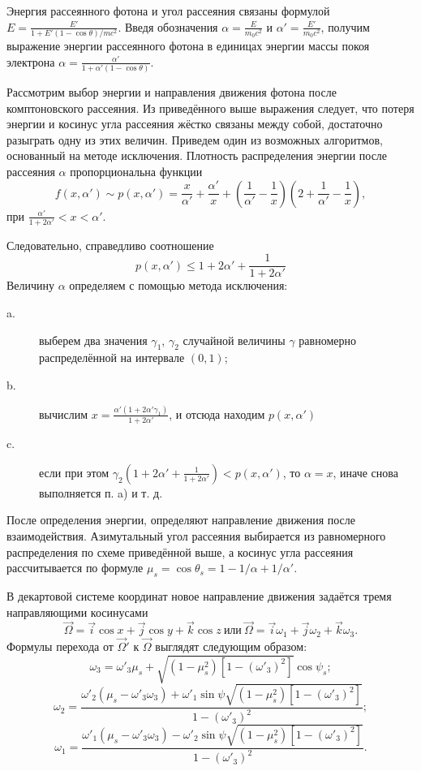 \documentclass[
11pt,
master, %
subf, %
href, %
colorlinks=true, %
]{disser}
\begin{document}
Энергия рассеянного фотона и угол рассеяния связаны формулой $E= \frac{E'}{1+E'(1-\cos \theta )/mc^{2}}$. Введя обозначения $\alpha =\frac{E}{m_{0} c^{2}} $ и $\alpha '=\frac{E'}{m_{0} c^{2} } $, получим выражение энергии рассеянного фотона в единицах энергии массы покоя электрона
$\alpha =\frac{\alpha '}{1+\alpha '(1-\cos \theta )}.$

Рассмотрим выбор энергии и направления движения фотона после комптоновского рассеяния. Из приведённого выше выражения следует, что потеря энергии и косинус угла рассеяния жёстко связаны между собой, достаточно разыграть одну из этих величин. Приведем один из возможных алгоритмов, основанный на методе исключения. Плотность распределения энергии после рассеяния $\alpha $ пропорциональна функции
\[
f(x,\alpha ')\sim p(x,\alpha ')=\frac{x}{\alpha '} +\frac{\alpha '}{x} + \left(\frac{1}{\alpha '} -\frac{1}{x} \right) \left(2+\frac{1}{\alpha '} -\frac{1}{x} \right),
\]
при $\frac{\alpha '}{1+2\alpha '} <x<\alpha '$.

Следовательно, справедливо соотношение
\[p(x,\alpha ')\le 1+2\alpha '+\frac{1}{1+2\alpha '} \]
Величину $\alpha $ определяем с помощью метода исключения:
\begin{description}
  \item[a.] выберем два значения $\gamma _{1} $, $\gamma _{2} $ случайной величины  $\gamma $ равномерно распределённой на интервале $(0,1)$;
  \item[b.] вычислим $x=\frac{\alpha ' \left(1+2\alpha '\gamma _{1} \right)}{1+2\alpha '} $, и отсюда находим $p \left(x,\alpha ' \right)$
  \item[c.] если при этом $\gamma _{2} \left(1+2\alpha '+\frac{1}{1+2\alpha '} \right)<p(x,\alpha ')$, то $\alpha =x$, иначе снова выполняется п. a) и т. д.
\end{description}

После определения энергии, определяют направление движения после взаимодействия. Азимутальный угол рассеяния выбирается из равномерного распределения по схеме приведённой выше, а косинус угла рассеяния рассчитывается по формуле  $\mu _{s} =\cos \theta _{s} =1-1/\alpha +1/\alpha '$.

В декартовой системе координат новое направление движения задаётся тремя направляющими косинусами
$$\vec{\Omega }=\vec{i}\cos x+\vec{j}\cos y+\vec{k}\cos z~\text{или}~\vec{\Omega }=\vec{i}\omega _{1} +\vec{j}\omega _{2} +\vec{k}\omega _{3}.$$
Формулы перехода от $\vec{\Omega }'$ к $\vec{\Omega }$ выглядят следующим образом:
$$
\omega _{3} =\omega '_{3} \mu _{s} +\sqrt{ \left(1-\mu _{s}^{2} \right) \left[1- \left(\omega '_{3} \right)^{2} \right]} \cos \psi _{s};
$$
$$
\omega _{2} =\frac{\omega '_{2} \left(\mu _{s} -\omega '_{3} \omega _{3} \right)+\omega '_{1} \sin \psi \sqrt{\left(1-\mu _{s}^{2} \right) \left[1-(\omega '_{3} )^{2} \right]} }{1-\left(\omega '_{3} \right)^{2} };
$$
$$
\omega _{1} = \frac{\omega '_{1} \left(\mu _{s} -\omega '_{3} \omega _{3} \right)-\omega '_{2} \sin \psi \sqrt{\left(1-\mu _{s}^{2} \right)[1-\left(\omega '_{3} \right)^{2} ]} }{1-\left(\omega '_{3} \right)^{2} }.
$$
\end{document}

